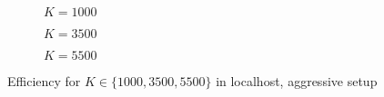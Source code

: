\begin{figure}[!hp]
\centering
\begin{subfigure}{0.23\textwidth}
	\captionsetup{justification=centering,font=scriptsize}
	\centering
	\setlength\fwidth{\textwidth}
	\setlength{}
	
	\caption{$K=1000$}
	\label{fig:lh_eff_1000}
\end{subfigure}\hspace{2em}%
\begin{subfigure}{0.23\textwidth}
	\captionsetup{justification=centering,font=scriptsize}
	\centering
	\setlength\fwidth{\textwidth}
	\setlength{}
	
	\caption{$K=3500$}
	\label{fig:lh_eff_3500}
\end{subfigure}\hspace{2em}%
\begin{subfigure}{0.23\textwidth}
	\captionsetup{justification=centering,font=scriptsize}
	\centering
	\setlength\fwidth{\textwidth}
	\setlength{}
	
	\caption{$K=5500$}
	\label{fig:lh_eff_5500}
\end{subfigure}
\caption{Efficiency for $K \in \{1000, 3500, 5500\}$ in localhost, aggressive setup}
\label{fig:efficiency_aggr}
\end{figure}


